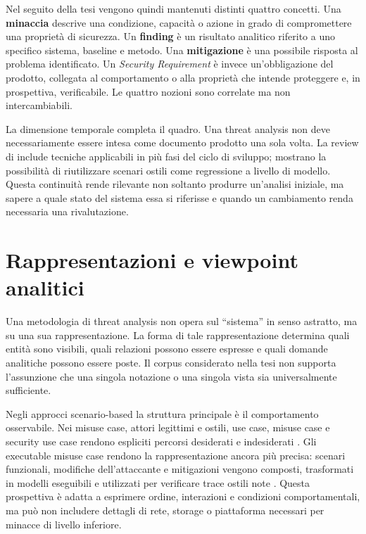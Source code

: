 \documentclass[12pt,a4paper,oneside]{report}
\newcommand{\securityrequirement}{\textit{Security Requirement}}
\begin{document}
Nel seguito della tesi vengono quindi mantenuti distinti quattro concetti. Una \textbf{minaccia} descrive una condizione, capacità o azione in grado di compromettere una proprietà di sicurezza. Un \textbf{finding} è un risultato analitico riferito a uno specifico sistema, baseline e metodo. Una \textbf{mitigazione} è una possibile risposta al problema identificato. Un \securityrequirement{} è invece un'obbligazione del prodotto, collegata al comportamento o alla proprietà che intende proteggere e, in prospettiva, verificabile. Le quattro nozioni sono correlate ma non intercambiabili.

La dimensione temporale completa il quadro. Una threat analysis non deve necessariamente essere intesa come documento prodotto una sola volta. La review di \citet{tuma2018threatanalysis} include tecniche applicabili in più fasi del ciclo di sviluppo; \citet{whittle2008executable} mostrano la possibilità di riutilizzare scenari ostili come regressione a livello di modello. Questa continuità rende rilevante non soltanto produrre un'analisi iniziale, ma sapere a quale stato del sistema essa si riferisse e quando un cambiamento renda necessaria una rivalutazione.

\section{Rappresentazioni e viewpoint analitici}

Una metodologia di threat analysis non opera sul ``sistema'' in senso astratto, ma su una sua rappresentazione. La forma di tale rappresentazione determina quali entità sono visibili, quali relazioni possono essere espresse e quali domande analitiche possono essere poste. Il corpus considerato nella tesi non supporta l'assunzione che una singola notazione o una singola vista sia universalmente sufficiente.

Negli approcci scenario-based la struttura principale è il comportamento osservabile. Nei misuse case, attori legittimi e ostili, use case, misuse case e security use case rendono espliciti percorsi desiderati e indesiderati \citep{sindre2005eliciting}. Gli executable misuse case rendono la rappresentazione ancora più precisa: scenari funzionali, modifiche dell'attaccante e mitigazioni vengono composti, trasformati in modelli eseguibili e utilizzati per verificare trace ostili note \citep{whittle2008executable}. Questa prospettiva è adatta a esprimere ordine, interazioni e condizioni comportamentali, ma può non includere dettagli di rete, storage o piattaforma necessari per minacce di livello inferiore.
\end{document}
